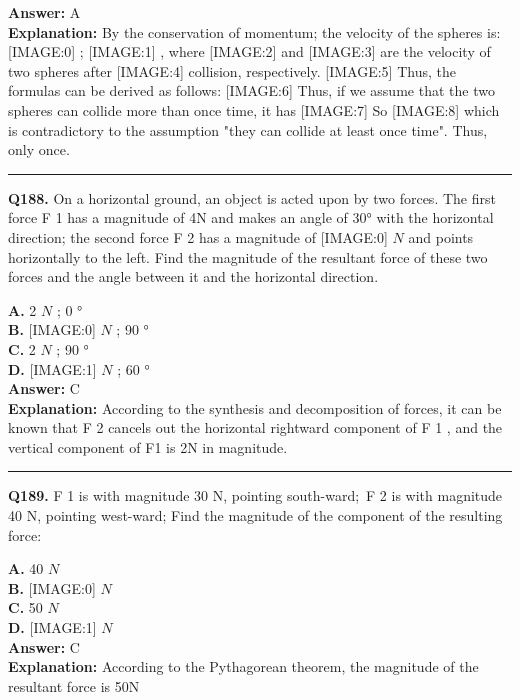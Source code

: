 \documentclass[12pt]{article}
\begin{document}
\textbf{Answer:} A \\
\textbf{Explanation:} By the conservation of momentum; the velocity of the spheres is:
[IMAGE:0]
;
[IMAGE:1]
, where
[IMAGE:2]
and
[IMAGE:3]
are the velocity of two spheres after
[IMAGE:4]
collision, respectively.
[IMAGE:5]
Thus, the formulas can be derived as follows:
[IMAGE:6]
Thus, if we assume that the two spheres can collide more than once time, it has
[IMAGE:7]
So
[IMAGE:8]
which is contradictory to the assumption "they can collide at least once time".
Thus, only once.

\hrule
\vspace{1em}


\noindent
\textbf{Q188.} On a horizontal ground, an object is acted upon by two forces. The first force F
1
has a magnitude of 4N and makes an angle of 30° with the horizontal direction; the second force F
2
has a magnitude of
[IMAGE:0]
$𝑁$
and points horizontally to the left. Find the magnitude of the resultant force of these two forces and the angle between it and the horizontal direction.



\textbf{A.} 2
$𝑁$
; 0
° \\
\textbf{B.} [IMAGE:0]
$𝑁$
; 90
° \\
\textbf{C.} 2
$𝑁$
;
90
° \\
\textbf{D.} [IMAGE:1]
$𝑁$
; 60
° \\

\textbf{Answer:} C \\
\textbf{Explanation:} According to the synthesis and decomposition of forces, it can be known that F
2
cancels out the horizontal rightward component of F
1
, and the vertical component of F1 is 2N in magnitude.

\hrule
\vspace{1em}


\noindent
\textbf{Q189.} F
1
is with magnitude 30 N, pointing south-ward; F
2
is with magnitude 40 N, pointing west-ward; Find the magnitude of the component of the resulting force:



\textbf{A.} 40
$𝑁$ \\
\textbf{B.} [IMAGE:0]
$𝑁$ \\
\textbf{C.} 50
$𝑁$ \\
\textbf{D.} [IMAGE:1]
$𝑁$ \\

\textbf{Answer:} C \\
\textbf{Explanation:} According to the Pythagorean theorem, the magnitude of the resultant force is 50N
\end{document}
